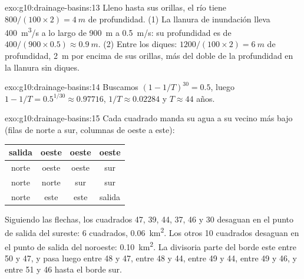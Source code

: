 \begin{solution}{exo:g10:drainage-basins:13}
Lleno hasta sus orillas, el río tiene $800/(100 \times 2) = \qty{4}{m}$ de
profundidad. (1) La llanura de inundación lleva \qty{400}{m^3/s} a lo largo
de \qty{900}{m} a \qty{0.5}{m/s}: su profundidad es de $400/(900 \times 0.5) \approx \qty{0.9}{m}$. (2) Entre los diques: $1200/(100 \times 2) = \qty{6}{m}$ de profundidad, \qty{2}{m} por encima de sus orillas, más del
doble de la profundidad en la llanura sin diques.
\end{solution}

\begin{solution}{exo:g10:drainage-basins:14}
Buscamos $(1 - 1/T)^{30} = 0.5$, luego $1 - 1/T = 0.5^{1/30} \approx 0.97716$,
$1/T \approx 0.02284$ y $T \approx 44$ años.
\end{solution}

\begin{solution}{exo:g10:drainage-basins:15}
Cada cuadrado manda su agua a su vecino más bajo (filas de norte a sur,
columnas de oeste a este):
\begin{center}
\begin{tabular}{|c|c|c|c|}
\hline
salida & oeste & oeste & oeste \\ \hline
norte & oeste & oeste & sur \\ \hline
norte & norte & sur & sur \\ \hline
norte & este & este & salida \\ \hline
\end{tabular}
\end{center}
Siguiendo las flechas, los cuadrados 47, 39, 44, 37, 46 y 30 desaguan en el
punto de salida del sureste: 6 cuadrados, \qty{0.06}{km^2}. Los otros 10
cuadrados desaguan en el punto de salida del noroeste: \qty{0.10}{km^2}. La
divisoria parte del borde este entre 50 y 47, y pasa luego entre 48 y 47,
entre 48 y 44, entre 49 y 44, entre 49 y 46, y entre 51 y 46 hasta el borde
sur.
\end{solution}

